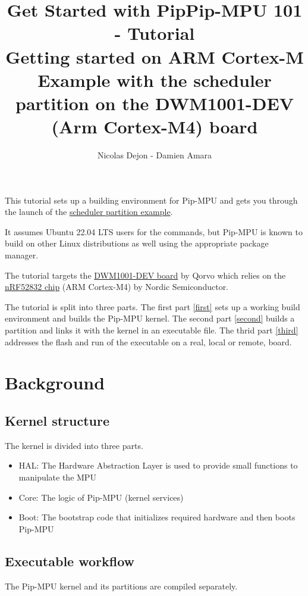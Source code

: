 \documentclass[10pt,a4paper,titlepage]{refart}
\title{Get Started with Pip}
\author{Nicolas Dejon - Damien Amara}
\title{Pip-MPU 101 -  Tutorial \\ Getting started on ARM Cortex-M \\ Example with the scheduler partition on the DWM1001-DEV (Arm Cortex-M4) board\\}
\begin{document}
\maketitle
\tableofcontents
\pagebreak

This tutorial sets up a building environment for Pip-MPU and gets you through the launch of the \href{(https://gitlab.univ-lille.fr/2xs/pip/pip-mpu-scheduler)}{scheduler partition example}.

It assumes Ubuntu 22.04 LTS users for the commands, but Pip-MPU is known to build on other Linux distributions as well using the appropriate package manager.

The tutorial targets the \href{https://www.qorvo.com/products/d/da007952}{DWM1001-DEV board} by Qorvo which relies on the \href{https://www.nordicsemi.com/products/nrf52832}{nRF52832 chip} (ARM Cortex-M4) by Nordic Semiconductor.

The tutorial is split into three parts.
The first part \ref{first} sets up a working build environment and builds the Pip-MPU kernel.
The second part \ref{second} builds a partition and links it with the kernel in an executable file.
The thrid part \ref{third} addresses the flash and run of the executable on a real, local or remote, board.

\section{Background}

\subsection{Kernel structure}

The kernel is divided into three parts.

\begin{itemize}
    \item HAL: The Hardware Abstraction Layer is used to provide small functions to manipulate the MPU
    \item Core: The logic of Pip-MPU (kernel services)
    \item Boot: The bootstrap code that initializes required hardware and then boots Pip-MPU
\end{itemize}

\subsection{Executable workflow}
The Pip-MPU kernel and its partitions are compiled separately.
\end{document}
